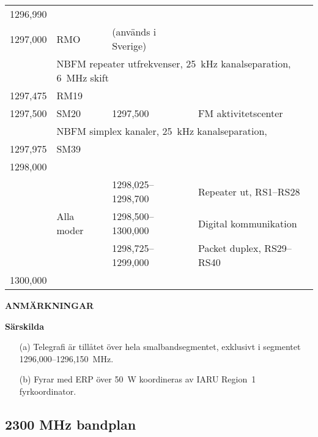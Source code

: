 \begin{longtable}{llll}
1296,990 & & & \\
1297,000 & RMO & (används i Sverige) & \\
         & \multicolumn{3}{l}{NBFM repeater utfrekvenser, 25~kHz kanalseparation, 6~MHz skift} \\
1297,475 & RM19 & & \\
1297,500 & SM20 & 1297,500 & FM aktivitetscenter \\
         & \multicolumn{3}{l}{NBFM simplex kanaler, 25~kHz kanalseparation,} \\
1297,975 & SM39 & & \\
1298,000 & & & \\
         &            & 1298,025--1298,700 & Repeater ut, RS1--RS28 \\
         & Alla moder & 1298,500--1300,000 & Digital kommunikation \\
         &            & 1298,725--1299,000 & Packet duplex, RS29--RS40 \\
1300,000 & & & \\
\end{longtable}

\textbf{ANMÄRKNINGAR}

\textbf{Särskilda}

\begin{itemize}
\item[(a)] Telegrafi är tillåtet över hela smalbandsegmentet, exklusivt
i segmentet 1296,000--1296,150~MHz.
\item[(b)] Fyrar med ERP över 50~W koordineras av IARU Region~1 fyrkoordinator.
\end{itemize}

\subsection{2300 MHz bandplan}

